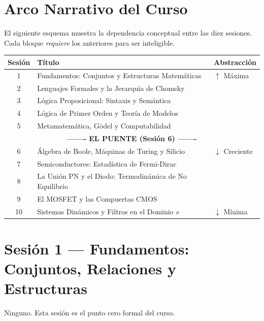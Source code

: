 \documentclass[11pt, letterpaper]{article}
\begin{document}
\section{Arco Narrativo del Curso}

El siguiente esquema muestra la dependencia conceptual entre las diez sesiones.
Cada bloque \emph{requiere} los anteriores para ser inteligible.

\begin{center}
\renewcommand{\arraystretch}{1.4}
\begin{tabular}{cll}
\toprule
\textbf{Sesión} & \textbf{Título} & \textbf{Abstracción} \\
\midrule
1 & Fundamentos: Conjuntos y Estructuras Matemáticas   & $\uparrow$ Máxima \\
2 & Lenguajes Formales y la Jerarquía de Chomsky        & \\
3 & Lógica Proposicional: Sintaxis y Semántica          & \\
4 & Lógica de Primer Orden y Teoría de Modelos          & \\
5 & Metamatemática, Gödel y Computabilidad              & \\
\midrule
\multicolumn{3}{c}{\textcolor{mitred}{\textbf{------- EL PUENTE (Sesión 6) -------}}} \\
\midrule
6 & Álgebra de Boole, Máquinas de Turing y Silicio      & $\downarrow$ Creciente \\
7 & Semiconductores: Estadística de Fermi-Dirac         & \\
8 & La Unión PN y el Diodo: Termodinámica de No Equilibrio & \\
9 & El MOSFET y las Compuertas CMOS                     & \\
10 & Sistemas Dinámicos y Filtros en el Dominio $s$     & $\downarrow$ Mínima \\
\bottomrule
\end{tabular}
\end{center}

\newpage

\section{Sesión 1 — Fundamentos: Conjuntos, Relaciones y Estructuras}

\begin{prereqs}
Ninguno. Esta sesión es el punto cero formal del curso.
\end{prereqs}
\end{document}
